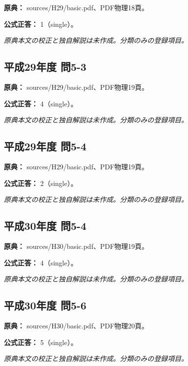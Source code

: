 \noindent\textbf{原典：} sources/H29/basic.pdf、PDF物理18頁。

\textbf{公式正答：} 1（single）。

\par\textit{原典本文の校正と独自解説は未作成。分類のみの登録項目。}

\subsection{平成29年度 問5-3}
\label{q:h29-reg-basic-5-3}

\noindent\textbf{原典：} sources/H29/basic.pdf、PDF物理19頁。

\textbf{公式正答：} 4（single）。

\par\textit{原典本文の校正と独自解説は未作成。分類のみの登録項目。}

\subsection{平成29年度 問5-4}
\label{q:h29-reg-basic-5-4}

\noindent\textbf{原典：} sources/H29/basic.pdf、PDF物理19頁。

\textbf{公式正答：} 2（single）。

\par\textit{原典本文の校正と独自解説は未作成。分類のみの登録項目。}

\subsection{平成30年度 問5-4}
\label{q:h30-reg-basic-5-4}

\noindent\textbf{原典：} sources/H30/basic.pdf、PDF物理19頁。

\textbf{公式正答：} 4（single）。

\par\textit{原典本文の校正と独自解説は未作成。分類のみの登録項目。}

\subsection{平成30年度 問5-6}
\label{q:h30-reg-basic-5-6}

\noindent\textbf{原典：} sources/H30/basic.pdf、PDF物理20頁。

\textbf{公式正答：} 5（single）。

\par\textit{原典本文の校正と独自解説は未作成。分類のみの登録項目。}


